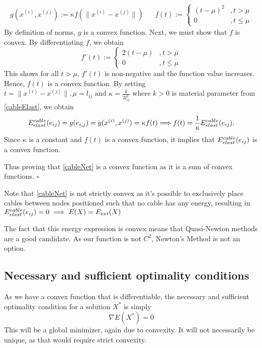 \begin{align*}
    g(x^{(i)},x^{(j)}) := \kappa f(\|x^{(i)} - x^{(j)}\|) && 
    f(t) := \begin{cases}
            (t - \mu)^2  & , t > \mu \\
            0           & , t \leq \mu
            \end{cases}
\end{align*}
By definition of norms, $g$ is a convex function. Next, we must show that $f$ is convex.
By differentiating $f$, we obtain 
$$
f'(t) := \begin{cases}
        2(t-\mu) &, t > \mu \\
        0       &, t \leq \mu
        \end{cases}
$$ 
This shows for all $t > \mu$, $f'(t)$ is non-negative and the function value increases. Hence, $f(t)$ is a convex function. By setting 
$t = \|x^{(i)} - x^{(j)}\|, \mu = l_{ij} \text{ and } \kappa = \frac{k}{2l^2_{ij}}$ where $k > 0$ is material parameter from \eqref{cableElast}, we obtain 
\begin{equation*}
    E^{cable}_{elast}(e_{ij}) = g(e_{i, j}) = g(x^{(i)}, x^{(j)}) = \kappa f(t) \Longrightarrow f(t) = \frac{1}{\kappa} E^{cable}_{elast}(e_{ij}).  
\end{equation*} 
Since $\kappa$ is a constant and $f(t)$ is a convex function, it implies that $E^{cable}_{elast}(e_{ij})$ is a convex function.

Thus proving that \eqref{cableNet} is a convex function as it is a sum of convex functions. \hfill $\square$

Note that \eqref{cableNet} is not strictly convex as it's possible to exclusively place cables between nodes positioned such that no cable has any energy, resulting in $E^{cable}_{elast}(e_{ij}) = 0 \implies E(X) = E_{ext}(X)$

The fact that this energy expression is convex means that Quasi-Newton methods are a good candidate. As our function is not $C^2$, Newton's Method is not an option. 

\subsection{Necessary and sufficient optimality conditions}
As we have a convex function that is differentiable, the necessary and sufficient optimality condition for a solution $X^*$ is simply \begin{equation}
    \nabla E(X^*) = 0
\end{equation}
This will be a global minimizer, again due to convexity. It will not necessarily be unique, as that would require strict convexity.








